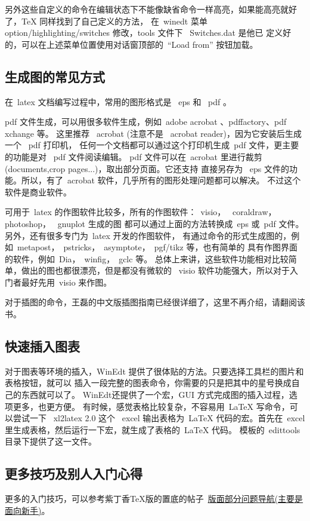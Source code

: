 另外这些自定义的命令在编辑状态下不能像缺省命令一样高亮，如果能高亮就好了，TeX 同样找到了自己定义的方法，
在~winedt 菜单~ option/highlighting/switches 修改，tools 文件下~ Switches.dat 是他已
定义好的，可以在上述菜单位置使用对话窗顶部的~``Load from'' 按钮加载。

\subsection{生成图的常见方式}

在~latex 文档编写过程中，常用的图形格式是~ eps 和~ pdf 。

pdf 文件生成，可以用很多软件生成，例如~adobe acrobat 、pdffactory、pdf xchange 等。
这里推荐~ acrobat (注意不是~ acrobat  reader)，因为它安装后生成一个~ pdf 打印机，
任何一个文档都可以通过这个打印机生成~pdf 文件，更主要的功能是对~ pdf 文件阅读编辑。
pdf 文件可以在~acrobat 里进行裁剪~ (documents,crop pages...)，取出部分页面。它还支持
直接另存为~ eps 文件的功能。所以，有了~acrobat 软件，几乎所有的图形处理问题都可以解决。
不过这个软件是商业软件。

可用于~latex 的作图软件比较多，所有的作图软件：~visio，~ coraldraw，~ photoshop，~ gnuplot 生成的图
都可以通过上面的方法转换成~eps 或~pdf 文件。另外，还有很多专门为~latex 开发的作图软件，
有通过命令的形式生成图的，例如~metapost，~pstricks，~asymptote，~pgf/tikz 等，也有简单的
具有作图界面的软件，例如~Dia，~winfig，~gclc 等。  总体上来讲，这些软件功能相对比较简单，做出的图也都很漂亮，但是都没有微软的
~visio 软件功能强大，所以对于入门者最好先用~visio 来作图。

对于插图的命令，王磊的中文版插图指南已经很详细了，这里不再介绍，请翻阅该书。

\subsection{快速插入图表}

对于图表等环境的插入，WinEdt 提供了很体贴的方法。只要选择工具栏的图片和表格按钮，就可以
插入一段完整的图表命令，你需要的只是把其中的星号换成自己的东西就可以了。
WinEdt还提供了一个宏，GUI 方式完成图的插入过程，选项更多，也更方便。
有时候，感觉表格比较复杂，不容易用~LaTeX 写命令，可以尝试一下 ~xl2latex 2.0 这个~ excel
输出表格为~LaTeX 代码的宏。首先在~excel 里生成表格，然后运行一下宏，就生成了表格的~LaTeX 代码。
模板的~edittools 目录下提供了这一文件。

\subsection{更多技巧及别人入门心得}
更多的入门技巧，可以参考紫丁香TeX版的置底的帖子~\href{http://bbs.hit.edu.cn/bbscon.php?board=TeX&id=2038&ftype=11}{版面部分问题导航(主要是面向新手)}。

